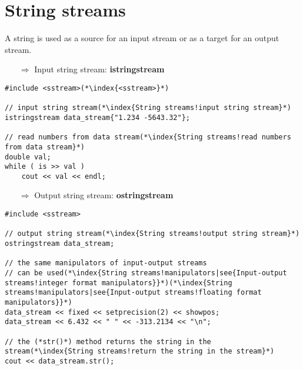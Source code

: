\documentclass[10pt]{article}
\begin{document}
\section{String streams}
\small
A string is used as a source for an input stream or as a target for an output stream. \\
\begin{enumerate}
\item[$\Rightarrow$] Input string stream: \textbf{istringstream}
\end{enumerate}
\begin{lstlisting}
#include <sstream>(*\index{<sstream>}*)

// input string stream(*\index{String streams!input string stream}*)
istringstream data_stream{"1.234 -5643.32"};

// read numbers from data stream(*\index{String streams!read numbers from data stream}*)
double val;
while ( is >> val )
    cout << val << endl;
\end{lstlisting}
\begin{enumerate}
\item[$\Rightarrow$] Output string stream: \textbf{ostringstream}
\end{enumerate}
\begin{lstlisting}
#include <sstream>

// output string stream(*\index{String streams!output string stream}*)
ostringstream data_stream;

// the same manipulators of input-output streams
// can be used(*\index{String streams!manipulators|see{Input-output streams!integer format manipulators}}*)(*\index{String streams!manipulators|see{Input-output streams!floating format manipulators}}*)
data_stream << fixed << setprecision(2) << showpos;
data_stream << 6.432 << " " << -313.2134 << "\n";

// the (*str()*) method returns the string in the stream(*\index{String streams!return the string in the stream}*)
cout << data_stream.str();
\end{lstlisting}
%
%
\end{document}
